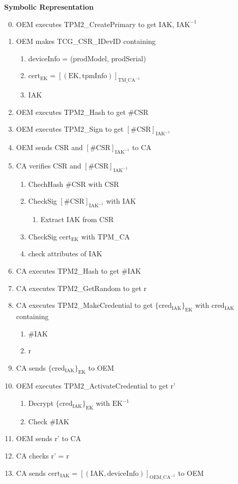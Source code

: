\documentclass{article}
\begin{document}
\textbf{Symbolic Representation}
\begin{enumerate}
    \setcounter{enumi}{-1}
    \item OEM executes TPM2\_CreatePrimary to get IAK, $\text{IAK}^{-1}$
    \item OEM makes TCG\_CSR\_IDevID containing
    \begin{enumerate}
        \item deviceInfo = (prodModel, prodSerial)
        \item $\text{cert}_{\text{EK}} = [(\text{EK}, \text{tpmInfo})]_{\text{TM\_CA}^{-1}}$
        \item IAK
    \end{enumerate}
    \item OEM executes TPM2\_Hash to get $\text{\#CSR}$
    \item OEM executes TPM2\_Sign to get $[\text{\#CSR}]_{\text{IAK}^{-1}}$
    \item OEM sends CSR and $[\text{\#CSR}]_{\text{IAK}^{-1}}$ to CA
    \item CA verifies CSR and $[\text{\#CSR}]_{\text{IAK}^{-1}}$
    \begin{enumerate}
        \item ChechHash \#CSR with CSR
        \item CheckSig $[\text{\#CSR}]_{\text{IAK}^{-1}}$ with IAK
        \begin{enumerate}
          \item Extract IAK from CSR
        \end{enumerate}
        \item CheckSig $\text{cert}_\text{EK}$ with TPM\_CA
        \item check attributes of IAK
    \end{enumerate}
    \item CA executes TPM2\_Hash to get \#IAK
    \item CA executes TPM2\_GetRandom to get r
    \item CA executes TPM2\_MakeCredential to get $\{\text{cred}_\text{IAK}\}_\text{EK}$ with $\text{cred}_\text{IAK}$ containing
    \begin{enumerate}
        \item \#IAK
        \item r
    \end{enumerate}
    \item CA sends $\{\text{cred}_\text{IAK}\}_\text{EK}$ to OEM
    \item OEM executes TPM2\_ActivateCredential to get r'
    \begin{enumerate}
        \item Decrypt $\{\text{cred}_\text{IAK}\}_\text{EK}$ with $\text{EK}^{-1}$
        \item Check \#IAK
    \end{enumerate}
    \item OEM sends r' to CA
    \item CA checks r' = r
    \item CA sends $\text{cert}_{\text{IAK}} = [(\text{IAK}, \text{deviceInfo})]_{\text{OEM\_CA}^{-1}}$ to OEM
\end{enumerate}
\end{document}
